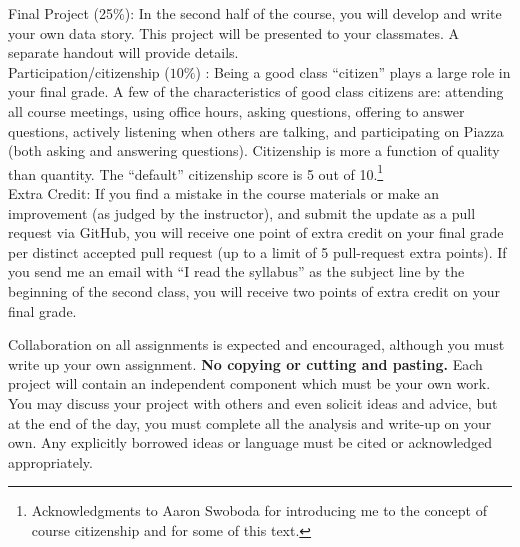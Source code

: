 \documentclass[10pt]{article}
\begin{document}
\noindent Final Project (25\%): In the second half of the course, you will develop and write your own data story. This project will be presented to your classmates. A separate handout will provide details. \\

\noindent Participation/citizenship ($10\%$) : Being a good class ``citizen'' plays a large role in your final grade. A few of the characteristics of good class citizens are: attending all course meetings, using office hours, asking questions, offering to answer questions, actively listening when others are talking, and participating on Piazza (both asking and answering questions). Citizenship is more a function of quality than quantity. The ``default'' citizenship score is 5 out of 10.\footnote{Acknowledgments to Aaron Swoboda for introducing me to the concept of course citizenship and for some of this text.} \\


\noindent Extra Credit: If you find a mistake in the course materials or make an improvement (as judged by the instructor), and submit the update as a pull request via GitHub, you will receive one point of extra credit on your final grade per distinct accepted pull request (up to a limit of 5 pull-request extra points). If you send me an email with ``I read the syllabus'' as the subject line by the beginning of the second class, you will receive two points of extra credit on your final grade. 




\bigskip
{}

\noindent Collaboration on all assignments is expected and encouraged, although you must write up your own assignment. {\bf No copying or cutting and pasting.} Each project will contain an independent component which must be your own work. You may discuss your project with others and even solicit ideas and advice, but at the end of the day, you must complete all the analysis and write-up on your own. Any explicitly borrowed ideas or language must be cited or acknowledged appropriately.
\end{document}
